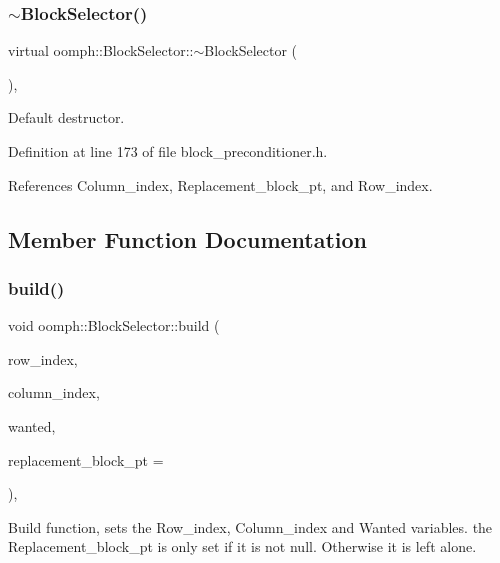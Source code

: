 \subsubsection{\texorpdfstring{$\sim$\+Block\+Selector()}{~BlockSelector()}}
{\footnotesize\ttfamily virtual oomph\+::\+Block\+Selector\+::$\sim$\+Block\+Selector (\begin{DoxyParamCaption}{ }\end{DoxyParamCaption})\hspace{0.3cm}{\ttfamily [inline]}, {\ttfamily [virtual]}}



Default destructor. 



Definition at line 173 of file block\+\_\+preconditioner.\+h.



References Column\+\_\+index, Replacement\+\_\+block\+\_\+pt, and Row\+\_\+index.



\subsection{Member Function Documentation}
\mbox{\label{classoomph_1_1BlockSelector_a5ed23c2fc70d78b46ddad425a9a91dfe}} 
\subsubsection{\texorpdfstring{build()}{build()}}
{\footnotesize\ttfamily void oomph\+::\+Block\+Selector\+::build (\begin{DoxyParamCaption}\item[{const unsigned \&}]{row\+\_\+index,  }\item[{const unsigned \&}]{column\+\_\+index,  }\item[{const bool \&}]{wanted,  }\item[{\hyperlink{classoomph_1_1CRDoubleMatrix}{C\+R\+Double\+Matrix} $\ast$}]{replacement\+\_\+block\+\_\+pt = {} }\end{DoxyParamCaption})\hspace{0.3cm}{\ttfamily [inline]}, {\ttfamily [private]}}

Build function, sets the Row\+\_\+index, Column\+\_\+index and Wanted variables. the Replacement\+\_\+block\+\_\+pt is only set if it is not null. Otherwise it is left alone. 

